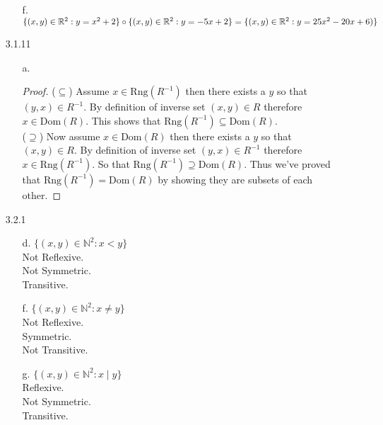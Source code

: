 \documentclass[11pt]{amsart}
\theoremstyle{definition}
\begin{document}
\begin{itemize}
\begin{itemize}
    \item[f.] $\{(x,y)\in\mathbb{R}^2:y=x^2+2\}\circ\{(x,y)\in\mathbb{R}^2:y=-5x+2\}\\
              =\{(x,y)\in\mathbb{R}^2:y=25x^2-20x+6)\}$

\end{itemize}

\item[3.1.11]
\begin{itemize}
    \item[a.]
    \begin{proof}
        ($\subseteq$) Assume $x\in\text{Rng}(R^{-1})$ then there exists a $y$ so that $(y,x)\in R^{-1}$. By definition of inverse set $(x,y)\in R$ therefore $x\in\text{Dom}(R)$. This shows that $\text{Rng}(R^{-1})\subseteq \text{Dom}(R)$.\\
        ($\supseteq$) Now assume $x\in\text{Dom}(R)$ then there exists a $y$ so that $(x,y)\in R$. By definition of inverse set $(y,x)\in R^{-1}$ therefore $x\in\text{Rng}(R^{-1})$. So that $\text{Rng}(R^{-1})\supseteq \text{Dom}(R)$.
        Thus we've proved that $\text{Rng}(R^{-1})=\text{Dom}(R)$ by showing they are subsets of each other.
    \end{proof}

\end{itemize}

\item[3.2.1]
\begin{itemize}
    \item[d.] $\{(x,y)\in\mathbb{N}^2:x<y\}$ \\
              Not Reflexive. \\
              Not Symmetric. \\
              Transitive.

    \item[f.] $\{(x,y)\in\mathbb{N}^2:x\ne y\}$ \\
              Not Reflexive. \\
              Symmetric. \\
              Not Transitive.

    \item[g.] $\{(x,y)\in\mathbb{N}^2:x\mid y\}$ \\
              Reflexive. \\
              Not Symmetric. \\
              Transitive.

\end{itemize}


\end{itemize}
\end{document}
